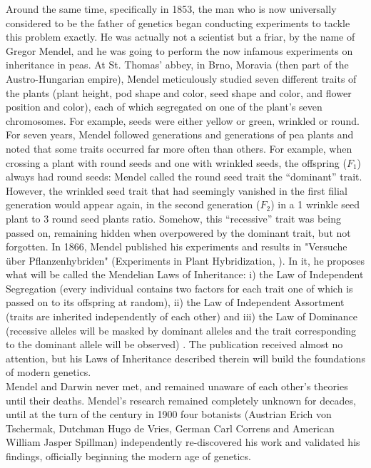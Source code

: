 Around the same time, specifically in 1853, the man who is now universally considered to be the father of genetics began conducting experiments to tackle this problem exactly. 
He was actually not a scientist but a friar, by the name of Gregor Mendel, and he was going to perform the now infamous experiments on inheritance in peas. 
At St. Thomas’ abbey, in Brno, Moravia (then part of the Austro-Hungarian empire), Mendel meticulously studied seven different traits of the plants (plant height, pod shape and color, seed shape and color, and flower position and color), each of which segregated on one of the plant's seven chromosomes. 
For example, seeds were either yellow or green, wrinkled or round. For seven years, Mendel followed generations and generations of pea plants and noted that some traits occurred far more often than others. 
For example, when crossing a plant with round seeds and one with wrinkled seeds, the offspring ($F_1$) always had round seeds: Mendel called the round seed trait the “dominant” trait. However, the wrinkled seed trait that had seemingly vanished in the first filial generation would appear again, in the second generation ($F_2$) in a 1 wrinkle seed plant to 3 round seed plants ratio. Somehow, this “recessive” trait was being passed on, remaining hidden when overpowered by the dominant trait, but not forgotten. 
In 1866, Mendel published his experiments and results in "Versuche über Pflanzenhybriden" (Experiments in Plant Hybridization, \cite{mendel1996experiments}). 
In it, he proposes what will be called the Mendelian Laws of Inheritance: i) the Law of Independent Segregation (every individual contains two factors for each trait one of which is passed on to its offspring at random), ii) the Law of Independent Assortment (traits are inherited independently of each other) and iii) the Law of Dominance (recessive alleles will be masked by dominant alleles and the trait corresponding to the dominant allele will be observed) \cite{mendel1996experiments}. 
The publication received almost no attention, but his Laws of Inheritance described therein will build the foundations of modern genetics.\\

Mendel and Darwin never met, and remained unaware of each other’s theories until their deaths. Mendel’s research remained completely unknown for decades, until at the turn of the century in 1900 four botanists (Austrian Erich von Tschermak, Dutchman Hugo de Vries, German Carl Correns and American William Jasper Spillman) independently re-discovered his work and validated his findings, officially beginning the modern age of genetics.

